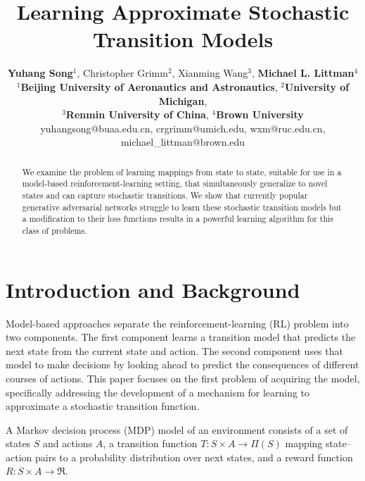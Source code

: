 \documentclass[letterpaper]{article} %
\begin{document}
%
\title{Learning Approximate Stochastic Transition Models}
\author{\textbf{Yuhang Song}$^1$, Christopher Grimm$^2$, Xianming Wang$^3$, \textbf{Michael L. Littman}$^4$ \\
  $^{1}$\textbf{Beijing University of Aeronautics and Astronautics}, $^{2}$\textbf{University of Michigan}, \\ $^{3}$\textbf{Renmin University of China}, $^{4}$\textbf{Brown University}\\
  yuhangsong@buaa.edu.cn, crgrimm@umich.edu, wxm@ruc.edu.cn, michael\_littman@brown.edu}
\maketitle
\begin{abstract}
We examine the problem of learning mappings from state to state, suitable for use in a model-based reinforcement-learning setting, that simultaneously generalize to novel states and can capture stochastic transitions. We show that currently popular generative adversarial networks struggle to learn these stochastic transition models but a modification to their loss functions results in a powerful learning algorithm for this class of problems.
\end{abstract}

\section{Introduction and Background}

Model-based approaches separate the reinforcement-learning (RL) problem into two components. The first component learns a transition model that predicts the next state from the current state and action. The second component uses that model to make decisions by looking ahead to predict the consequences of different courses of actions. This paper focuses on the first problem of acquiring the model, specifically addressing the development of a mechanism for learning to approximate a stochastic transition function.


A Markov decision process (MDP) model of an environment consists of a set of states $S$ and actions $A$, a transition function $T:S\times A \rightarrow \Pi(S)$ mapping state--action pairs to a probability distribution over next states, and a reward function $R:S\times A \rightarrow \Re$.
\end{document}
